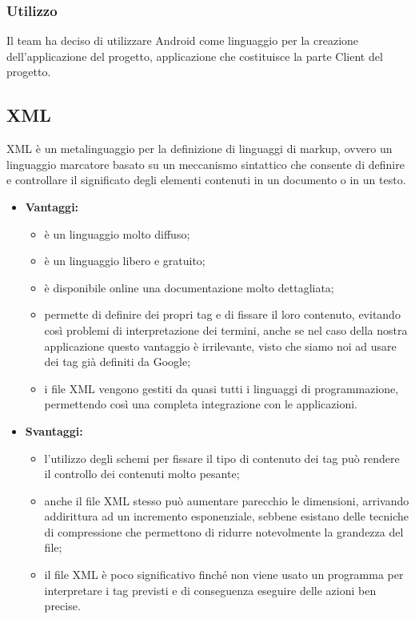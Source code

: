 	\subsubsection{Utilizzo}
	Il team ha deciso di utilizzare Android come linguaggio per la creazione dell'applicazione del progetto, applicazione che costituisce la parte Client del progetto.
	
\subsection{XML}
	
	XML è un metalinguaggio per la definizione di linguaggi di markup, ovvero un linguaggio marcatore basato su un meccanismo sintattico che consente di definire e controllare il significato degli elementi contenuti in un documento o in un testo.
	
	\begin{itemize}
		\item \textbf{Vantaggi:}
			\begin{itemize}
				\item è un linguaggio molto diffuso;
				\item è un linguaggio libero e gratuito;
				\item è disponibile online una documentazione molto dettagliata;
				\item permette di definire dei propri tag e di fissare il loro contenuto, evitando così problemi di interpretazione dei termini, anche se nel caso della nostra applicazione questo vantaggio è irrilevante, visto che siamo noi ad usare dei tag già definiti da Google;
				\item i file XML vengono gestiti da quasi tutti i linguaggi di programmazione, permettendo così una completa integrazione con le applicazioni.
			\end{itemize}
		\item \textbf{Svantaggi:}
			\begin{itemize}
				\item l'utilizzo degli schemi per fissare il tipo di contenuto dei tag può rendere il controllo dei contenuti molto pesante;
				\item anche il file XML stesso può aumentare parecchio le dimensioni, arrivando addirittura ad un incremento esponenziale, sebbene esistano delle tecniche di compressione che permettono di ridurre notevolmente la grandezza del file;
				\item il file XML è poco significativo finché non viene usato un programma per interpretare i tag previsti e di conseguenza eseguire delle azioni ben precise.
			\end{itemize}
	\end{itemize}
